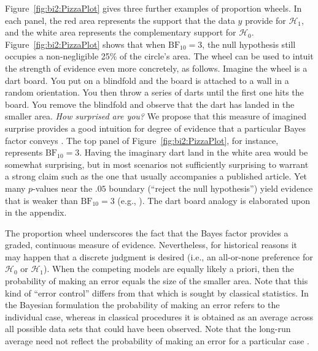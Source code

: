 Figure~\ref{fig:bi2:PizzaPlot} gives three further examples of proportion wheels. In each panel, the red area represents the support that the data $y$ provide for $\mathcal{H}_1$, and the white area represents the complementary support for $\mathcal{H}_0$. Figure~\ref{fig:bi2:PizzaPlot} shows that when $\text{BF}_{10}=3$, the null hypothesis still occupies a non-negligible 25\% of the circle's area. The wheel can be used to intuit the strength of evidence even more concretely, as follows. Imagine the wheel is a dart board. You put on a blindfold and the board is attached to a wall in a random orientation. You then throw a series of darts until the first one hits the board. You remove the blindfold and observe that the dart has landed in the smaller area. \emph{How surprised are you?} We propose that this measure of imagined surprise provides a good intuition for degree of evidence that a particular Bayes factor conveys \cite{JamilEtAlinpressMacAlister}. The top panel of Figure~\ref{fig:bi2:PizzaPlot}, for instance, represents $\text{BF}_{10}=3$. Having the imaginary dart land in the white area would be somewhat surprising, but in most scenarios not sufficiently surprising to warrant a strong claim such as the one that usually accompanies a published article. Yet many $p$-values near the $.05$ boundary (``reject the null hypothesis'') yield evidence that is weaker than $\text{BF}_{10}=3$ (e.g., ). The dart board analogy is elaborated upon in the appendix.

The proportion wheel underscores the fact that the Bayes factor provides a graded, continuous measure of evidence. Nevertheless, for historical reasons it may happen that a discrete judgment is desired (i.e., an all-or-none preference for $\mathcal{H}_0$ or $\mathcal{H}_1$). When the competing models are equally likely a priori, then the probability of making an error equals the size of the smaller area. Note that this kind of ``error control'' differs from that which is sought by classical statistics. In the Bayesian formulation the probability of making an error refers to the individual case, whereas in classical procedures it is obtained as an average across all possible data sets that could have been observed. Note that the long-run average need not reflect the probability of making an error for a particular case \cite{WagenmakersEtAlinpressPBRPartI}.


